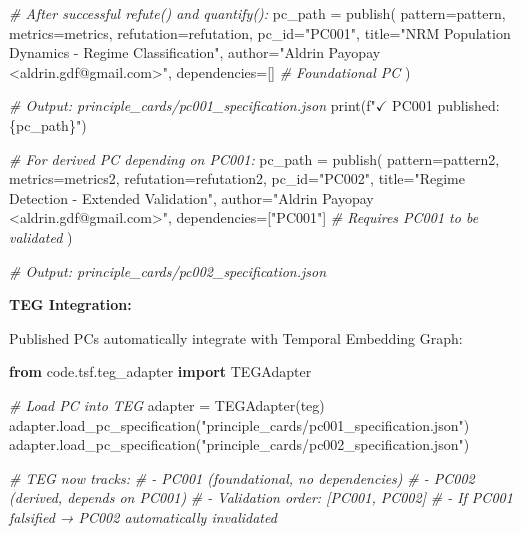 \documentclass[
]{article}
\newenvironment{Shaded}{}{}
\newcommand{\BuiltInTok}[1]{\textcolor[rgb]{0.00,0.50,0.00}{#1}}
\newcommand{\CommentTok}[1]{\textcolor[rgb]{0.38,0.63,0.69}{\textit{#1}}}
\newcommand{\ImportTok}[1]{\textcolor[rgb]{0.00,0.50,0.00}{\textbf{#1}}}
\newcommand{\NormalTok}[1]{#1}
\newcommand{\OperatorTok}[1]{\textcolor[rgb]{0.40,0.40,0.40}{#1}}
\newcommand{\SpecialCharTok}[1]{\textcolor[rgb]{0.25,0.44,0.63}{#1}}
\newcommand{\SpecialStringTok}[1]{\textcolor[rgb]{0.73,0.40,0.53}{#1}}
\newcommand{\StringTok}[1]{\textcolor[rgb]{0.25,0.44,0.63}{#1}}
\begin{document}
\begin{Shaded}
\begin{Highlighting}[]
\CommentTok{\# After successful refute() and quantify():}
\NormalTok{pc\_path }\OperatorTok{=}\NormalTok{ publish(}
\NormalTok{    pattern}\OperatorTok{=}\NormalTok{pattern,}
\NormalTok{    metrics}\OperatorTok{=}\NormalTok{metrics,}
\NormalTok{    refutation}\OperatorTok{=}\NormalTok{refutation,}
\NormalTok{    pc\_id}\OperatorTok{=}\StringTok{"PC001"}\NormalTok{,}
\NormalTok{    title}\OperatorTok{=}\StringTok{"NRM Population Dynamics {-} Regime Classification"}\NormalTok{,}
\NormalTok{    author}\OperatorTok{=}\StringTok{"Aldrin Payopay \textless{}aldrin.gdf@gmail.com\textgreater{}"}\NormalTok{,}
\NormalTok{    dependencies}\OperatorTok{=}\NormalTok{[]  }\CommentTok{\# Foundational PC}
\NormalTok{)}

\CommentTok{\# Output: principle\_cards/pc001\_specification.json}
\BuiltInTok{print}\NormalTok{(}\SpecialStringTok{f"$\checkmark$ PC001 published: }\SpecialCharTok{\{}\NormalTok{pc\_path}\SpecialCharTok{\}}\SpecialStringTok{"}\NormalTok{)}

\CommentTok{\# For derived PC depending on PC001:}
\NormalTok{pc\_path }\OperatorTok{=}\NormalTok{ publish(}
\NormalTok{    pattern}\OperatorTok{=}\NormalTok{pattern2,}
\NormalTok{    metrics}\OperatorTok{=}\NormalTok{metrics2,}
\NormalTok{    refutation}\OperatorTok{=}\NormalTok{refutation2,}
\NormalTok{    pc\_id}\OperatorTok{=}\StringTok{"PC002"}\NormalTok{,}
\NormalTok{    title}\OperatorTok{=}\StringTok{"Regime Detection {-} Extended Validation"}\NormalTok{,}
\NormalTok{    author}\OperatorTok{=}\StringTok{"Aldrin Payopay \textless{}aldrin.gdf@gmail.com\textgreater{}"}\NormalTok{,}
\NormalTok{    dependencies}\OperatorTok{=}\NormalTok{[}\StringTok{"PC001"}\NormalTok{]  }\CommentTok{\# Requires PC001 to be validated}
\NormalTok{)}

\CommentTok{\# Output: principle\_cards/pc002\_specification.json}
\end{Highlighting}
\end{Shaded}

\textbf{TEG Integration:}

Published PCs automatically integrate with Temporal Embedding Graph:

\begin{Shaded}
\begin{Highlighting}[]
\ImportTok{from}\NormalTok{ code.tsf.teg\_adapter }\ImportTok{import}\NormalTok{ TEGAdapter}

\CommentTok{\# Load PC into TEG}
\NormalTok{adapter }\OperatorTok{=}\NormalTok{ TEGAdapter(teg)}
\NormalTok{adapter.load\_pc\_specification(}\StringTok{"principle\_cards/pc001\_specification.json"}\NormalTok{)}
\NormalTok{adapter.load\_pc\_specification(}\StringTok{"principle\_cards/pc002\_specification.json"}\NormalTok{)}

\CommentTok{\# TEG now tracks:}
\CommentTok{\# {-} PC001 (foundational, no dependencies)}
\CommentTok{\# {-} PC002 (derived, depends on PC001)}
\CommentTok{\# {-} Validation order: [PC001, PC002]}
\CommentTok{\# {-} If PC001 falsified → PC002 automatically invalidated}
\end{Highlighting}
\end{Shaded}
\end{document}
